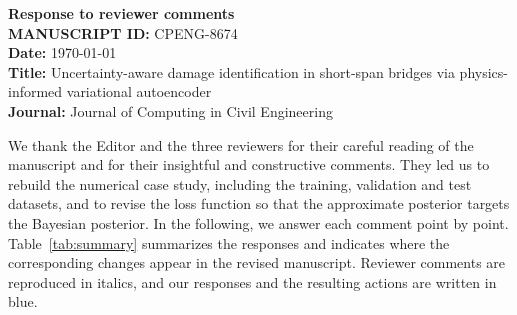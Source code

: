 \documentclass[11pt]{article}
\begin{document}
\begin{center}
{\Large\bfseries Response to reviewer comments}\\[8pt]
\textbf{MANUSCRIPT ID:} CPENG-8674\\
\textbf{Date:} \today\\
\textbf{Title:} Uncertainty-aware damage identification in short-span bridges via physics-informed variational
autoencoder\\
\textbf{Journal:} Journal of Computing in Civil Engineering
\end{center}

\noindent{}

\bigskip
We thank the Editor and the three reviewers for their careful reading of the manuscript and for their insightful and
constructive comments. They led us to rebuild the numerical case study, including the training, validation and test
datasets, and to revise the loss function so that the approximate posterior targets the Bayesian posterior. In the
following, we answer each comment point by point. Table~\ref{tab:summary} summarizes the responses and indicates where
the corresponding changes appear in the revised manuscript. Reviewer comments are reproduced in italics, and our
responses and the resulting actions are written in blue.

\end{document}
